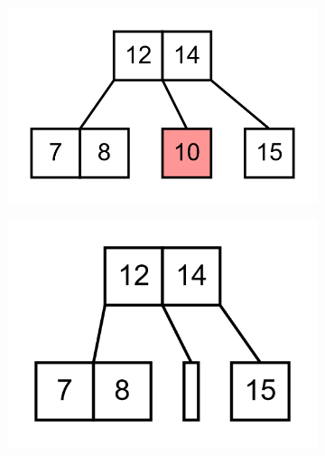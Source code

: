 \documentclass[11pt,a4paper]{article}
\begin{document}
\begin{loesung}
\begin{enumerate}
\begin{figure}[h!]
\begin{subfigure}[b]{0.31\textwidth}
            \end{subfigure}
            \begin{subfigure}[b]{0.31\textwidth}
                \centering
                \includegraphics[scale=0.15]{img/3e/16}
            \end{subfigure}
            \begin{subfigure}[b]{0.31\textwidth}
                \centering
                \includegraphics[scale=0.15]{img/3e/16a}
            \end{subfigure}
            \begin{subfigure}[b]{0.31\textwidth}
                \centering

\end{subfigure}
\end{figure}
\end{enumerate}
\end{loesung}
\end{document}
